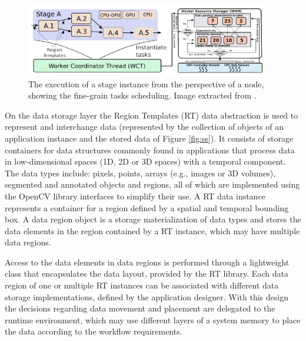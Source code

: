 \begin{figure}[t!]
\begin{center}
\includegraphics[width=0.95\textwidth]{img/task-sched.png}
\caption{The execution of a stage instance from the perspective of a node, showing the fine-grain tasks scheduling. Image extracted from \cite{rtf1}.}
\label{fig:ts}
\end{center}
\vspace{-4mm}
\end{figure}

On the data storage layer the Region Templates (RT) data abstraction is used to represent and interchange data (represented by the collection of objects of an application instance and the stored data of Figure \ref{fig:ss}). It consists of storage containers for data structures commonly found in applications that process data in low-dimensional spaces (1D, 2D or 3D spaces) with a temporal component. The data types include: pixels, points, arrays (e.g., images or 3D volumes), segmented and annotated objects and regions, all of which are implemented using the OpenCV \cite{opencv} library interfaces to simplify their use. A RT data instance represents a container for a region defined by a spatial and temporal bounding box. A data region object is a storage materialization of data types and stores the data elements in the region contained by a RT instance, which may have multiple data regions. 

Access to the data elements in data regions is performed through a lightweight class that encapsulates the data layout, provided by the RT library. Each data region of one or multiple RT instances can be associated with different data storage implementations, defined by the application designer. With this design  the decisions regarding data movement and placement are delegated to the runtime environment, which may use different layers of a system memory to place the data according to the workflow requirements.


